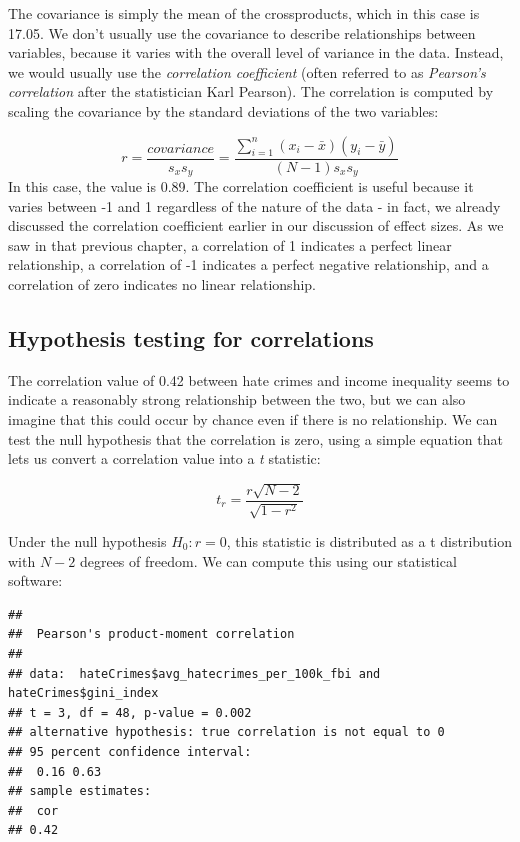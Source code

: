 \documentclass[12pt,]{book}
\theoremstyle{definition}
\theoremstyle{definition}
\theoremstyle{definition}
\theoremstyle{remark}
\begin{document}
The covariance is simply the mean of the crossproducts, which in this case is 17.05. We don't usually use the covariance to describe relationships between variables, because it varies with the overall level of variance in the data. Instead, we would usually use the \emph{correlation coefficient} (often referred to as \emph{Pearson's correlation} after the statistician Karl Pearson). The correlation is computed by scaling the covariance by the standard deviations of the two variables:

\[
r = \frac{covariance}{s_xs_y} = \frac{\sum_{i=1}^n (x_i - \bar{x})(y_i - \bar{y})}{(N - 1)s_x s_y}
\]
In this case, the value is 0.89. The correlation coefficient is useful because it varies between -1 and 1 regardless of the nature of the data - in fact, we already discussed the correlation coefficient earlier in our discussion of effect sizes. As we saw in that previous chapter, a correlation of 1 indicates a perfect linear relationship, a correlation of -1 indicates a perfect negative relationship, and a correlation of zero indicates no linear relationship.

\hypertarget{hypothesis-testing-for-correlations}{%
\subsection{Hypothesis testing for correlations}\label{hypothesis-testing-for-correlations}}

The correlation value of 0.42 between hate crimes and income inequality seems to indicate a reasonably strong relationship between the two, but we can also imagine that this could occur by chance even if there is no relationship. We can test the null hypothesis that the correlation is zero, using a simple equation that lets us convert a correlation value into a \emph{t} statistic:

\[
\textit{t}_r =  \frac{r\sqrt{N-2}}{\sqrt{1-r^2}}
\]

Under the null hypothesis \(H_0:r=0\), this statistic is distributed as a t distribution with \(N - 2\) degrees of freedom. We can compute this using our statistical software:

\begin{verbatim}
## 
##  Pearson's product-moment correlation
## 
## data:  hateCrimes$avg_hatecrimes_per_100k_fbi and hateCrimes$gini_index
## t = 3, df = 48, p-value = 0.002
## alternative hypothesis: true correlation is not equal to 0
## 95 percent confidence interval:
##  0.16 0.63
## sample estimates:
##  cor 
## 0.42
\end{verbatim}
\end{document}
